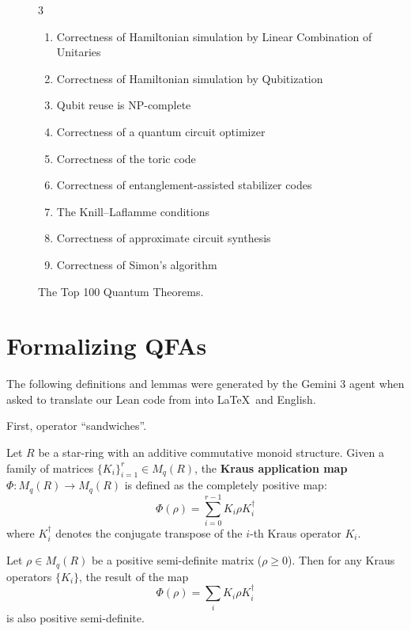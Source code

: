 \begin{figure}
\begin{multicols}{3}
{\begin{enumerate}
\item Correctness of Hamiltonian simulation by Linear Combination of Unitaries
\item Correctness of Hamiltonian simulation by Qubitization
\item Qubit reuse is NP-complete
\item Correctness of a quantum circuit optimizer
\item Correctness of the toric code
\item Correctness of entanglement-assisted stabilizer codes
\item The Knill–Laflamme conditions
\item Correctness of approximate circuit synthesis
\item Correctness of Simon’s algorithm
\end{enumerate}
}
\end{multicols}

\caption{The Top 100 Quantum Theorems.}\label{100}
\end{figure}

\section{Formalizing QFAs}
The following definitions and lemmas were generated by the Gemini 3 agent when asked to translate our Lean code from \cite{kraus} into \LaTeX\ and English.

First, operator ``sandwiches''.
\begin{definition}\label{krausApply}
	\leanok
Let $R$ be a star-ring with an additive commutative monoid structure. Given a family of matrices $\{K_i\}_{i=1}^r \in M_q(R)$, the \textbf{Kraus application map} $\Phi: M_q(R) \to M_q(R)$ is defined as the completely positive map:
\begin{equation}
    \Phi(\rho) = \sum_{i=0}^{r-1} K_i \rho K_i^\dagger
\end{equation}
where $K_i^\dagger$ denotes the conjugate transpose of the $i$-th Kraus operator $K_i$.
\end{definition}

\begin{lemma}\label{posSemidef_of_isStarProjection}
\leanok
Let $\rho \in M_q(R)$ be a positive semi-definite matrix ($\rho \ge 0$). Then for any Kraus operators $\{K_i\}$, the result of the map 
\[ \Phi(\rho) = \sum_{i} K_i \rho K_i^\dagger \]
is also positive semi-definite.
\end{lemma}

